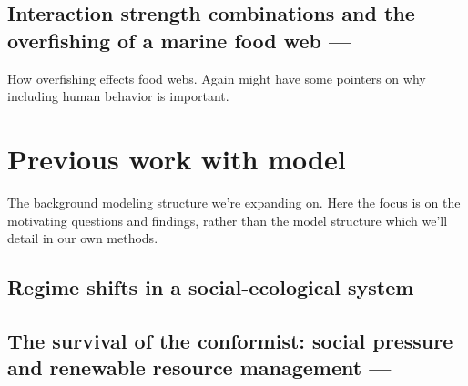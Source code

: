 \documentclass[12pt, a4paper]{article}
\begin{document}
\subsection{Interaction strength combinations and the overfishing of a marine food web --- \cite{Bascompteetal2005}}
How overfishing effects food webs. Again might have some pointers on why including human behavior is important. 

\section{Previous work with model}

The background modeling structure we're expanding on. Here the focus is on the motivating questions and findings, rather than the model structure which we'll detail in our own methods. 

\subsection{Regime shifts in a social-ecological system --- \cite{Ladeetal2013}}

\subsection{The survival of the conformist: social pressure and renewable resource management --- \cite{Tavonietal2012}}



\end{document}
